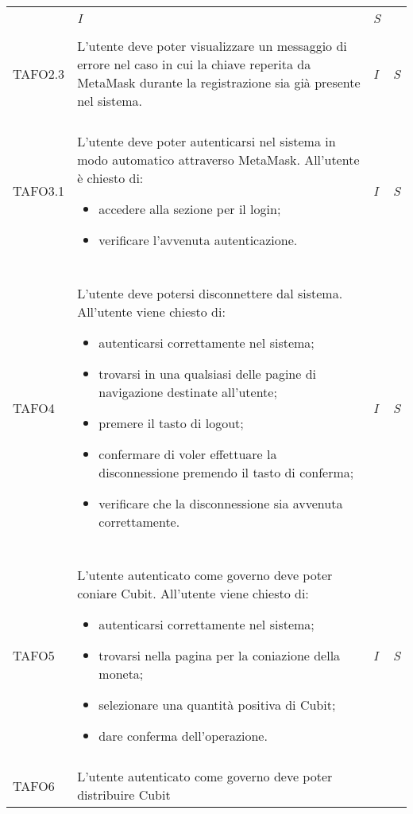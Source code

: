 \begin{longtable}{ >{\centering}p{} >{}p{}
			>{\centering}p{} >{\centering}p{}}
\begin{itemize}
		 \end{itemize} & \textit{I} & \textit{S}\\ \tabularnewline
\hypertarget{TAFO2.3}{TAFO2.3} & L'utente deve poter visualizzare un messaggio di errore nel caso in cui la
		 chiave reperita da MetaMask\glo{} durante la registrazione sia già presente
		 nel sistema. & \textit{I} & \textit{S}\\ \tabularnewline
\hypertarget{TAFO3.1}{TAFO3.1} & L'utente deve poter autenticarsi nel sistema in modo automatico attraverso
		 MetaMask\glo{}. All'utente è chiesto di:
		 \begin{itemize}
		 	\item accedere alla sezione per il login;
		 	\item verificare l'avvenuta autenticazione.
		 \end{itemize} & \textit{I} & \textit{S}\\ \tabularnewline
\hypertarget{TAFO4}{TAFO4} & L'utente deve potersi disconnettere dal sistema. All'utente viene chiesto di:
		 \begin{itemize}
		 	\item autenticarsi correttamente nel sistema;
		 	\item trovarsi in una qualsiasi delle pagine di navigazione destinate 
		 	all'utente;
		 	\item premere il tasto di logout;
		 	\item confermare di voler effettuare la disconnessione premendo il tasto 
		 	di conferma;
		 	\item verificare che la disconnessione sia avvenuta correttamente.
		 \end{itemize} & \textit{I} & \textit{S}\\ \tabularnewline
\hypertarget{TAFO5}{TAFO5} & L'utente autenticato come governo deve poter coniare Cubit\glo{}.
		 All'utente viene chiesto di:
		 \begin{itemize}
		 	\item autenticarsi correttamente nel sistema;
		 	\item trovarsi nella pagina per la coniazione della moneta;
		 	\item selezionare una quantità positiva di Cubit\glo{};
		 	\item dare conferma dell'operazione. 
		 \end{itemize} & \textit{I} & \textit{S}\\ \tabularnewline
\hypertarget{TAFO6}{TAFO6} & L'utente autenticato come governo deve poter distribuire Cubit\glo{}

\end{longtable}
